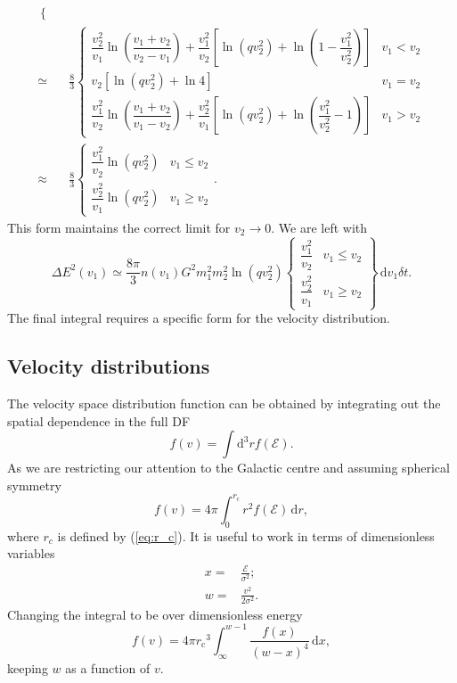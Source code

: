 \documentclass[useAMS,usedcolumn,usegraphicx,usenatbib]{mn2e}
\newcommand{\eqnref}[1]{(\ref{eq:#1})}
\newcommand{\sub}[1]{\ensuremath{_\mathrm{#1}}}
\newcommand{\dd}{\ensuremath{\mathrm{d}}}
\newcommand{\intd}[4]{\ensuremath{\displaystyle \int_{#1}^{#2}{#3}\,\dd{#4}}}
\begin{document}
\begin{onecolumn}
\begin{align}
\begin{cases}
\end{cases} \\
 \simeq {} & \frac{8}{3}\begin{cases}
\dfrac{v_2^2}{v_1}\ln\left(\dfrac{v_1 + v_2}{v_2 - v_1}\right) + \dfrac{v_1^2}{v_2}\left[\ln\left(qv_2^2\right) + \ln\left(1 - \dfrac{v_1^2}{v_2^2}\right)\right] & v_1 < v_2 \\
v_2\left[\ln\left(qv_2^2\right) + \ln 4\right] & v_1 = v_2\\
\dfrac{v_1^2}{v_2}\ln\left(\dfrac{v_1 + v_2}{v_1 - v_2}\right) + \dfrac{v_2^2}{v_1}\left[\ln\left(qv_2^2\right) + \ln\left(\dfrac{v_1^2}{v_2^2} - 1\right)\right] & v_1 > v_2
\end{cases} \\
\approx {} & \frac{8}{3}\begin{cases}
\dfrac{v_1^2}{v_2}\ln\left(qv_2^2\right) & v_1 \leq v_2 \\
\dfrac{v_2^2}{v_1}\ln\left(qv_2^2\right) & v_1 \geq v_2
\end{cases}.
\end{align}
This form maintains the correct limit for $v_2 \rightarrow 0$. We are left with
\begin{equation}
\Delta E^2(v_1) \simeq \frac{8\pi}{3} n(v_1)G^2m_1^2 m_2^2\ln\left(qv_2^2\right)\left\{\begin{array}{lr}\dfrac{v_1^2}{v_2} & v_1 \leq v_2\\ \dfrac{v_2^2}{v_1} & v_1 \geq v_2 \end{array}\right\}\,\dd v_1\delta t.
\end{equation}
The final integral requires a specific form for the velocity distribution.

\subsection{Velocity distributions}

The velocity space distribution function can be obtained by integrating out the spatial dependence in the full DF
\begin{equation}
f(v) = \int \dd^3r f(\mathcal{E}).
\end{equation}
As we are restricting our attention to the Galactic centre and assuming spherical symmetry
\begin{equation}
f(v) = 4\pi\intd{0}{r\sub{c}}{r^2f(\mathcal{E})}{r},
\end{equation}
where $r_c$ is defined by \eqnref{r_c}. It is useful to work in terms of dimensionless variables
\begin{align}
x = {} & \frac{\mathcal{E}}{\sigma^2}; \\
w = {} & \frac{v^2}{2\sigma^2}.
\end{align}
Changing the integral to be over dimensionless energy
\begin{equation}
f(v) = 4\pi r\sub{c}^3\intd{\infty}{w - 1}{\frac{f(x)}{(w-x)^4}}{x},
\end{equation}
keeping $w$ as a function of $v$.


\end{onecolumn}
\end{document}
